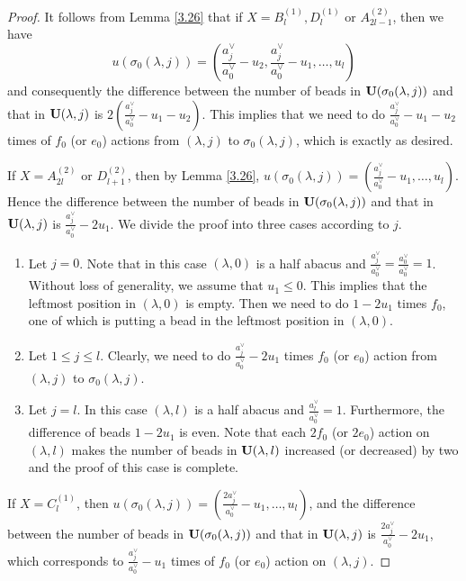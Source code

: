 \documentclass[11pt]{amsart}
\theoremstyle{plain}
\numberwithin{equation}{subsection}
\newcommand{\lam}{\lambda}
\begin{document}
\begin{proof}
It follows from Lemma \ref{3.26} that if
$X=B_l^{(1)}, D_l^{(1)}$ or $A_{2l-1}^{(2)}$, then we have $$u(\sigma_0(\lam, j))=
(\frac{a_j^{\vee}}{a_0^{\vee}}-u_2, \frac{a_j^{\vee}}{a_0^{\vee}}-u_1, \dots, u_l)$$ and consequently the 
difference between the number of beads in ${\rm\bf U}(\sigma_0(\lam, j))$ and that in ${\rm\bf U}(\lam, j)$
is $2(\frac{a_j^{\vee}}{a_0^{\vee}}-u_1-u_2)$. This implies that we need to do $\frac{a_j^{\vee}}{a_0^{\vee}}-u_1-u_2$
times of $f_0$ (or $e_0$) actions from $(\lam, j)$ to $\sigma_0(\lam, j)$, which is exactly as desired.

If $X=A_{2l}^{(2)}$ or $D_{l+1}^{(2)}$, then by Lemma \ref{3.26}, $u(\sigma_0(\lam, j))=
(\frac{a_j^{\vee}}{a_0^{\vee}}-u_1, \dots, u_l)$. Hence the difference between the number of beads 
 in ${\rm\bf U}(\sigma_0(\lam, j))$ and that in ${\rm\bf U}(\lam, j)$ is $\frac{a_j^{\vee}}{a_0^{\vee}}-2u_1$.
We divide the proof into three cases according to $j$. 

\begin{enumerate}
 \item [\rm Case 1.] Let $j=0$. Note that in this case $(\lam, 0)$ is a half abacus and 
 $\frac{a_j^{\vee}}{a_0^{\vee}}=\frac{a_0^{\vee}}{a_0^{\vee}}=1$. 
 Without loss of generality, we assume that $u_1\leq 0$. This implies that the leftmost position in $(\lam, 0)$ is empty.
 Then we need to do $1-2u_1$ times $f_0$,
 one of which is putting a bead in the leftmost position in $(\lam, 0)$.
 \item [\rm Case 2.] Let $1\leq j\leq l$. 
 Clearly, we need to do $\frac{a_j^{\vee}}{a_0^{\vee}}-2u_1$ times $f_0$ (or $e_0$) action from $(\lam, j)$ to $\sigma_0(\lam, j)$.
 \item [\rm Case 3.] Let $j=l$. In this case $(\lam, l)$ is a half abacus and 
 $\frac{a_l^{\vee}}{a_0^{\vee}}=1$. 
 Furthermore, the difference of beads $1-2u_1$ is even. Note that each $2f_0$ (or $2e_0$) action on $(\lam, l)$
 makes the number of beads in ${\rm\bf U}(\lam, l)$ increased (or decreased) by two and the proof of this case is complete.
\end{enumerate}

If $X = C_l^{(1)}$, then $u(\sigma_0(\lam, j))=
(\frac{2a_j^{\vee}}{a_0^{\vee}}-u_1, \dots, u_l)$, and the difference between the number of beads 
 in ${\rm\bf U}(\sigma_0(\lam, j))$ and that in ${\rm\bf U}(\lam, j)$ is $\frac{2a_j^{\vee}}{a_0^{\vee}}-2u_1$,
 which corresponds to $\frac{a_j^{\vee}}{a_0^{\vee}}-u_1$ times of $f_0$ (or $e_0$) action on $(\lam, j)$.
\end{proof}
\end{document}
